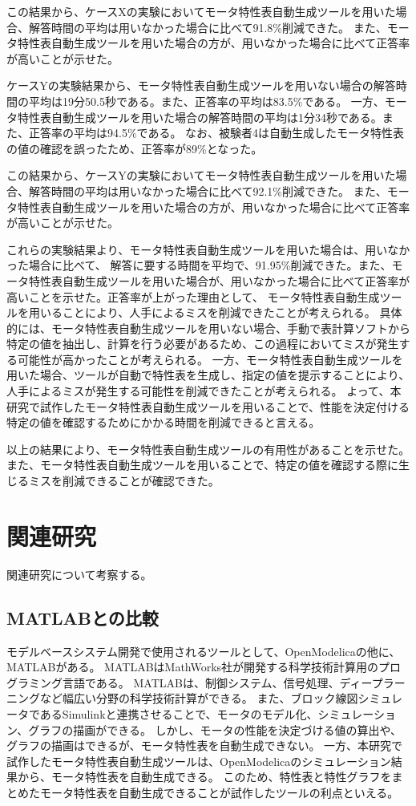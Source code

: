 この結果から、ケースXの実験においてモータ特性表自動生成ツールを用いた場合、解答時間の平均は用いなかった場合に比べて91.8\%削減できた。
また、モータ特性表自動生成ツールを用いた場合の方が、用いなかった場合に比べて正答率が高いことが示せた。

ケースYの実験結果から、モータ特性表自動生成ツールを用いない場合の解答時間の平均は19分50.5秒である。また、正答率の平均は83.5\%である。
一方、モータ特性表自動生成ツールを用いた場合の解答時間の平均は1分34秒である。また、正答率の平均は94.5\%である。
なお、被験者4は自動生成したモータ特性表の値の確認を誤ったため、正答率が89\%となった。

この結果から、ケースYの実験においてモータ特性表自動生成ツールを用いた場合、解答時間の平均は用いなかった場合に比べて92.1\%削減できた。
また、モータ特性表自動生成ツールを用いた場合の方が、用いなかった場合に比べて正答率が高いことが示せた。


これらの実験結果より、モータ特性表自動生成ツールを用いた場合は、用いなかった場合に比べて、
解答に要する時間を平均で、91.95\%削減できた。また、モータ特性表自動生成ツールを用いた場合が、用いなかった場合に比べて正答率が高いことを示せた。正答率が上がった理由として、
モータ特性表自動生成ツールを用いることにより、人手によるミスを削減できたことが考えられる。
具体的には、モータ特性表自動生成ツールを用いない場合、手動で表計算ソフトから特定の値を抽出し、計算を行う必要があるため、この過程においてミスが発生する可能性が高かったことが考えられる。
一方、モータ特性表自動生成ツールを用いた場合、ツールが自動で特性表を生成し、指定の値を提示することにより、人手によるミスが発生する可能性を削減できたことが考えられる。
よって、本研究で試作したモータ特性表自動生成ツールを用いることで、性能を決定付ける特定の値を確認するためにかかる時間を削減できると言える。

以上の結果により、モータ特性表自動生成ツールの有用性があることを示せた。また、モータ特性表自動生成ツールを用いることで、特定の値を確認する際に生じるミスを削減できることが確認できた。

\section{関連研究}
関連研究について考察する。

\subsection{MATLABとの比較}
モデルベースシステム開発で使用されるツールとして、OpenModelicaの他に、MATLAB\cite{MATLAB技術30:online}がある。
MATLABはMathWorks社が開発する科学技術計算用のプログラミング言語である。
MATLABは、制御システム、信号処理、ディープラーニングなど幅広い分野の科学技術計算ができる。
また、ブロック線図シミュレータであるSimulink\cite{Simulink81:online}と連携させることで、モータのモデル化、シミュレーション、グラフの描画ができる。
しかし、モータの性能を決定づける値の算出や、グラフの描画はできるが、モータ特性表を自動生成できない。
一方、本研究で試作したモータ特性表自動生成ツールは、OpenModelicaのシミュレーション結果から、モータ特性表を自動生成できる。
このため、特性表と特性グラフをまとめたモータ特性表を自動生成できることが試作したツールの利点といえる。


